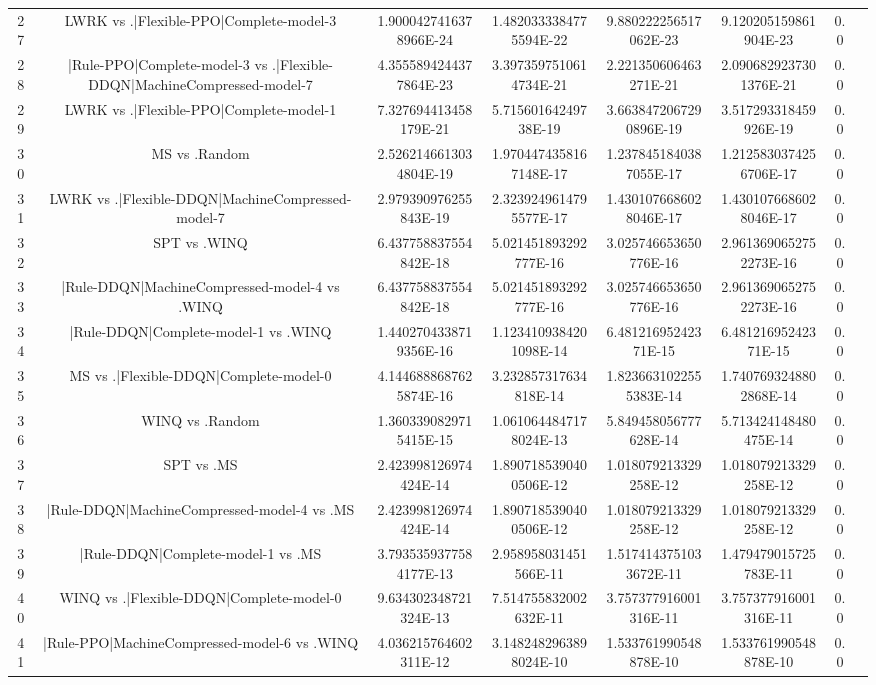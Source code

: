 \documentclass[a3paper,10pt]{article}
\begin{document}
\begin{table}[!htp]
\begin{tabular}{cccccccc}
27&LWRK vs .|Flexible-PPO|Complete-model-3&1.9000427416378966E-24&1.4820333384775594E-22&9.880222256517062E-23&9.120205159861904E-23&0.0\\
28&|Rule-PPO|Complete-model-3 vs .|Flexible-DDQN|MachineCompressed-model-7&4.3555894244377864E-23&3.3973597510614734E-21&2.221350606463271E-21&2.0906829237301376E-21&0.0\\
29&LWRK vs .|Flexible-PPO|Complete-model-1&7.327694413458179E-21&5.71560164249738E-19&3.6638472067290896E-19&3.517293318459926E-19&0.0\\
30&MS vs .Random&2.5262146613034804E-19&1.9704474358167148E-17&1.2378451840387055E-17&1.2125830374256706E-17&0.0\\
31&LWRK vs .|Flexible-DDQN|MachineCompressed-model-7&2.979390976255843E-19&2.3239249614795577E-17&1.4301076686028046E-17&1.4301076686028046E-17&0.0\\
32&SPT vs .WINQ&6.437758837554842E-18&5.021451893292777E-16&3.025746653650776E-16&2.9613690652752273E-16&0.0\\
33&|Rule-DDQN|MachineCompressed-model-4 vs .WINQ&6.437758837554842E-18&5.021451893292777E-16&3.025746653650776E-16&2.9613690652752273E-16&0.0\\
34&|Rule-DDQN|Complete-model-1 vs .WINQ&1.4402704338719356E-16&1.1234109384201098E-14&6.48121695242371E-15&6.48121695242371E-15&0.0\\
35&MS vs .|Flexible-DDQN|Complete-model-0&4.1446888687625874E-16&3.232857317634818E-14&1.8236631022555383E-14&1.7407693248802868E-14&0.0\\
36&WINQ vs .Random&1.3603390829715415E-15&1.0610644847178024E-13&5.849458056777628E-14&5.713424148480475E-14&0.0\\
37&SPT vs .MS&2.423998126974424E-14&1.8907185390400506E-12&1.018079213329258E-12&1.018079213329258E-12&0.0\\
38&|Rule-DDQN|MachineCompressed-model-4 vs .MS&2.423998126974424E-14&1.8907185390400506E-12&1.018079213329258E-12&1.018079213329258E-12&0.0\\
39&|Rule-DDQN|Complete-model-1 vs .MS&3.7935359377584177E-13&2.958958031451566E-11&1.5174143751033672E-11&1.479479015725783E-11&0.0\\
40&WINQ vs .|Flexible-DDQN|Complete-model-0&9.634302348721324E-13&7.514755832002632E-11&3.757377916001316E-11&3.757377916001316E-11&0.0\\
41&|Rule-PPO|MachineCompressed-model-6 vs .WINQ&4.036215764602311E-12&3.1482482963898024E-10&1.533761990548878E-10&1.533761990548878E-10&0.0\\

\end{tabular}
\end{table}
\end{document}
